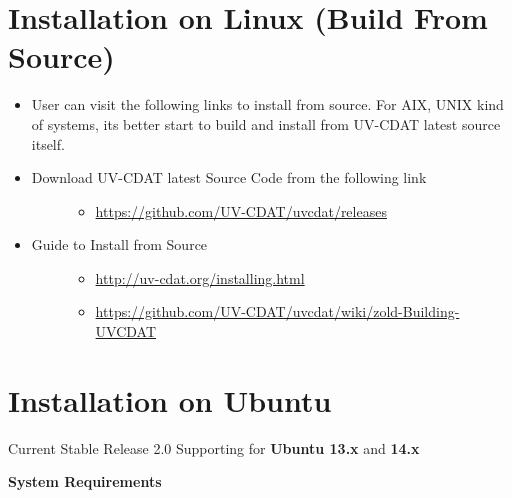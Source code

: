 \documentclass[letterpaper,10pt,english]{sphinxmanual}
\begin{document}
\section{Installation on Linux  (Build From Source)}
\label{getting_started:installation-on-linux-build-from-source}\begin{itemize}
\item {} 
User can visit the following links to install from source. For AIX, UNIX kind of systems, its better start to build and install from UV-CDAT latest source itself.

\item {} \begin{description}
\item[{Download UV-CDAT latest Source Code from the following link}] \leavevmode\begin{itemize}
\item {} 
\href{https://github.com/UV-CDAT/uvcdat/releases}{https://github.com/UV-CDAT/uvcdat/releases}

\end{itemize}

\end{description}

\item {} \begin{description}
\item[{Guide to Install from Source}] \leavevmode\begin{itemize}
\item {} 
\href{http://uv-cdat.org/installing.html}{http://uv-cdat.org/installing.html}

\item {} 
\href{https://github.com/UV-CDAT/uvcdat/wiki/zold-Building-UVCDAT}{https://github.com/UV-CDAT/uvcdat/wiki/zold-Building-UVCDAT}

\end{itemize}

\end{description}

\end{itemize}


\section{Installation on Ubuntu}
\label{getting_started:installation-on-ubuntu}
Current Stable Release 2.0 Supporting for \textbf{Ubuntu 13.x} and \textbf{14.x}

\textbf{System Requirements}
\end{document}
